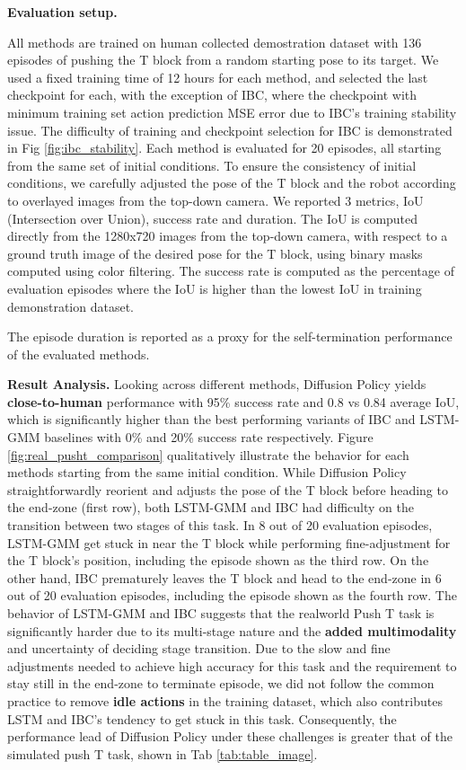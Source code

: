 \textbf{Evaluation setup.} 

 


All methods are trained on human collected demostration dataset with 136 episodes of pushing the T block from a random starting pose to its target. We used a fixed training time of 12 hours for each method, and selected the last checkpoint for each, with the exception of IBC, where the checkpoint with minimum training set action prediction MSE error due to IBC's training stability issue. The difficulty of training and checkpoint selection for IBC is demonstrated in Fig \ref{fig:ibc_stability}. Each method is evaluated for 20 episodes, all starting from the same set of initial conditions. To ensure the consistency of initial conditions, we carefully adjusted the pose of the T block and the robot according to overlayed images from the top-down camera. We reported 3 metrics, IoU (Intersection over Union), success rate and duration. The IoU is computed directly from the 1280x720 images from the top-down camera, with respect to a ground truth image of the desired pose for the T block, using binary masks computed using color filtering. The success rate is computed as the percentage of evaluation episodes where the IoU is higher than the lowest IoU in training demonstration dataset. 

The episode duration is reported as a proxy for the self-termination performance of the evaluated methods.

\textbf{Result Analysis.} Looking across different methods, Diffusion Policy yields \textbf{close-to-human} performance with 95\%  success rate and 0.8 vs 0.84 average IoU, which is significantly higher than the best performing variants of IBC and LSTM-GMM baselines with 0\% and 20\% success rate respectively. Figure \ref{fig:real_pusht_comparison} qualitatively illustrate the behavior for each methods starting from the same initial condition. 
While Diffusion Policy straightforwardly reorient and adjusts the pose of the T block before heading to the end-zone (first row), both LSTM-GMM and IBC had difficulty on the transition between two stages of this task. In 8 out of 20 evaluation episodes, LSTM-GMM get stuck in near the T block while performing fine-adjustment for the T block's position, including the episode shown as the third row. On the other hand, IBC prematurely leaves the T block and head to the end-zone in 6 out of 20 evaluation episodes, including the episode shown as the fourth row. 
The behavior of LSTM-GMM and IBC suggests that the realworld Push T task is significantly harder due to its multi-stage nature and the \textbf{added multimodality} and uncertainty of deciding stage transition. 
Due to the slow and fine adjustments needed to achieve high accuracy for this task and the requirement to stay still in the end-zone to terminate episode, we did not follow the common practice to remove \textbf{idle actions} in the training dataset, which also contributes LSTM and IBC's tendency to get stuck in this task.
Consequently, the performance lead of Diffusion Policy under these challenges is greater that of the simulated push T task, shown in Tab \ref{tab:table_image}. 

